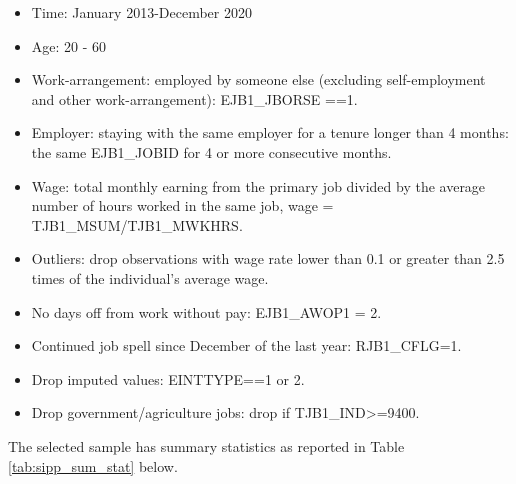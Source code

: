 \begin{itemize}
    \item Time: January 2013-December 2020
    \item Age: 20 - 60
    \item Work-arrangement: employed by someone else (excluding self-employment and other work-arrangement): EJB1\_JBORSE ==1.
    \item Employer: staying with the same employer for a tenure longer than 4 months: the same EJB1\_JOBID for  4 or more consecutive months. 
    \item Wage: total monthly earning from the primary job divided by the average number of hours worked in the same job, wage = TJB1\_MSUM/TJB1\_MWKHRS.
    \item Outliers: drop observations with wage rate lower than 0.1 or greater than 2.5 times of the individual's average wage.
    \item No days off from work without pay: EJB1\_AWOP1 = 2. 
    \item Continued job spell since December of the last year: RJB1\_CFLG=1.
    \item Drop imputed values: EINTTYPE==1 or 2.
    \item Drop government/agriculture jobs: drop if TJB1\_IND>=9400.
\end{itemize}

The selected sample has summary statistics as reported in Table \ref{tab:sipp_sum_stat} below. 

